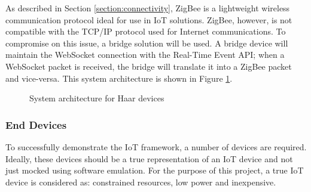       As described in Section \ref{section:connectivity}, ZigBee is a lightweight wireless communication protocol ideal for use in IoT solutions. ZigBee, however, is not compatible with the TCP/IP protocol used for Internet communications. To compromise on this issue, a bridge solution will be used. A bridge device will maintain the WebSocket connection with the Real-Time Event API; when a WebSocket packet is received, the bridge will translate it into a ZigBee packet and vice-versa. This system architecture is shown in Figure \ref{figure:wsn-architecture}.

      \begin{figure}
        \centering
      \caption{System architecture for Haar devices}\label{figure:wsn-architecture}
    \end{figure}

      \subsubsection{End Devices}
        To successfully demonstrate the IoT framework, a number of devices are required. Ideally, these devices should be a true representation of an IoT device and not just mocked using software emulation. For the purpose of this project, a true IoT device is considered as: constrained resources, low power and inexpensive.

